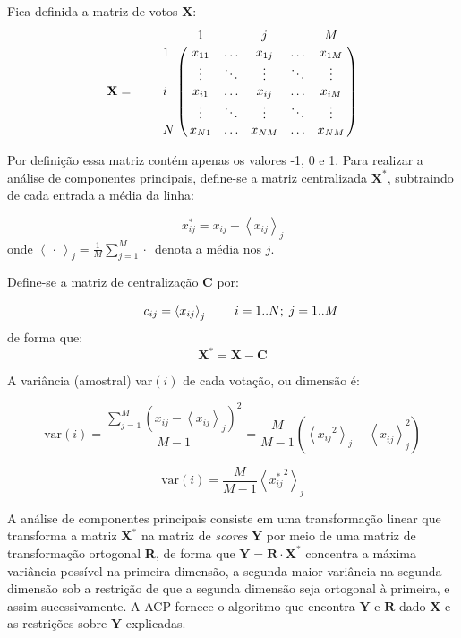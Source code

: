 \documentclass[
	article,			%
	12pt,				%
	oneside,			%
	a4paper,			%
	english,			%
	brazil,				%
	sumario=tradicional,
	oldfontcommands %
	]{abntex2}
\newcommand{\tikzmark}[1]{\tikz[overlay, remember picture] \coordinate (#1);}
\let\bbordermatrix\bordermatrix
\begin{document}
Fica definida a matriz de votos $\mathbf{X}$:
\medskip{}
\[
  \mathbf{X} = \qquad \bbordermatrix{~  & \tikzmark{harrowleft} 1 & ~ & j & ~
                        & M\tikzmark{harrowright}  \cr
                    \tikzmark{varrowtop} 
                    1 & x_{11} & \ldots & x_{1j} & \ldots & x_{1M} \cr
                    ~ & \vdots & \ddots & \vdots & \ddots & \vdots \cr
                    i & x_{i1} & \ldots & x_{ij} & \ldots & x_{iM} \cr
                    ~ & \vdots & \ddots & \vdots & \ddots & \vdots \cr
                    \tikzmark{varrowbottom}
                    N & x_{N1} & \ldots & x_{NM} & \ldots & x_{NM} \cr
                    }
\]

Por definição essa matriz contém apenas os valores -1, 0 e 1. Para realizar a análise de componentes principais, define-se a matriz centralizada $\mathbf{X^{*}}$, subtraindo de cada entrada a média da linha:

\begin{equation}
  x_{ij}^{*} = x_{ij} - \left< x_{ij} \right>_j 
  \label{eq:x-estrela}
\end{equation}
onde $\left< \,\cdot\, \right>_j = \frac{1}{M}\sum_{j=1}^{M} \cdot\,$ denota a média nos $j$.

Define-se a matriz de centralização $\mathbf{C}$ por:

\[
  \begin{array}{r r r r}
    ~ & c_{ij} = \left< x_{ij} \right>_{j} & ~ & i=1..N;\;j=1..M \\
  \end{array}
\]
de forma que:
\[
  \mathbf{X^{*}} = \mathbf{X} - \mathbf{C}
\]

A variância (amostral) var$(i)$ de cada votação, ou dimensão é:

\[
\mathrm{var}(i) = \frac{\sum_{j=1}^M \left( x_{ij} - \left< x_{ij} \right>_j \right)^2 }{M-1}
= \frac{M}{M-1}\left(\left< {x_{ij}}^{2} \right>_{j} - \left< x_{ij}^{~}\right>_{j}^{2} \right)
\]

\begin{equation}
\mathrm{var}(i) = \frac{M}{M-1}\left<{x_{ij}^{*}}^{2}\right>_{j}
\label{eq:variancia}
\end{equation}

A análise de componentes principais consiste em uma transformação linear que transforma a matriz $\mathbf{X^{*}}$ na matriz de \emph{scores} $\mathbf{Y}$ por meio de uma matriz de transformação ortogonal \textbf{R}, de forma que  $\mathbf{Y} = \mathbf{R}\cdot \mathbf{X^{*}}$ concentra a máxima variância possível na primeira dimensão, a segunda maior variância na segunda dimensão sob a restrição de que a segunda dimensão seja ortogonal à primeira, e assim sucessivamente. A ACP fornece o algoritmo que encontra $\mathbf{Y}$ e $\mathbf{R}$ dado $\mathbf{X}$ e as restrições sobre $\mathbf{Y}$ explicadas. 
\end{document}
